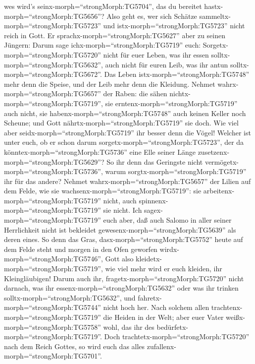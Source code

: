 wes wird's seinx-morph=``strongMorph:TG5704'', das du bereitet
hastx-morph=``strongMorph:TG5656''?  Also geht es, wer sich
Schätze sammeltx-morph=``strongMorph:TG5723'' und
istx-morph=``strongMorph:TG5723'' nicht reich in Gott.  Er
sprachx-morph=``strongMorph:TG5627'' aber zu seinen Jüngern: Darum sage
ichx-morph=``strongMorph:TG5719'' euch:
Sorgetx-morph=``strongMorph:TG5720'' nicht für euer Leben, was ihr essen
solltx-morph=``strongMorph:TG5632'', auch nicht für euren Leib, was ihr
antun solltx-morph=``strongMorph:TG5672''.  Das Leben
istx-morph=``strongMorph:TG5748'' mehr denn die Speise, und der Leib
mehr denn die Kleidung.  Nehmet
wahrx-morph=``strongMorph:TG5657'' der Raben: die sähen
nichtx-morph=``strongMorph:TG5719'', sie
erntenx-morph=``strongMorph:TG5719'' auch nicht, sie
habenx-morph=``strongMorph:TG5748'' auch keinen Keller noch Scheune; und
Gott nährtx-morph=``strongMorph:TG5719'' sie doch. Wie viel aber
seidx-morph=``strongMorph:TG5719'' ihr besser denn die Vögel!
 Welcher ist unter euch, ob er schon darum
sorgetx-morph=``strongMorph:TG5723'', der da
könntex-morph=``strongMorph:TG5736'' eine Elle seiner Länge
zusetzenx-morph=``strongMorph:TG5629''?  So ihr denn das
Geringste nicht vermögetx-morph=``strongMorph:TG5736'', warum
sorgtx-morph=``strongMorph:TG5719'' ihr für das andere? 
Nehmet wahrx-morph=``strongMorph:TG5657'' der Lilien auf dem Felde, wie
sie wachsenx-morph=``strongMorph:TG5719'': sie
arbeitenx-morph=``strongMorph:TG5719'' nicht, auch
spinnenx-morph=``strongMorph:TG5719'' sie nicht. Ich
sagex-morph=``strongMorph:TG5719'' euch aber, daß auch Salomo in aller
seiner Herrlichkeit nicht ist bekleidet
gewesenx-morph=``strongMorph:TG5639'' als deren eines.  So
denn das Gras, dasx-morph=``strongMorph:TG5752'' heute auf dem Felde
steht und morgen in den Ofen geworfen
wirdx-morph=``strongMorph:TG5746'', Gott also
kleidetx-morph=``strongMorph:TG5719'', wie viel mehr wird er euch
kleiden, ihr Kleingläubigen!  Darum auch ihr,
fragetx-morph=``strongMorph:TG5720'' nicht darnach, was ihr
essenx-morph=``strongMorph:TG5632'' oder was ihr trinken
solltx-morph=``strongMorph:TG5632'', und
fahretx-morph=``strongMorph:TG5744'' nicht hoch her.  Nach
solchem allen trachtenx-morph=``strongMorph:TG5719'' die Heiden in der
Welt; aber euer Vater weißx-morph=``strongMorph:TG5758'' wohl, das ihr
des bedürfetx-morph=``strongMorph:TG5719''.  Doch
trachtetx-morph=``strongMorph:TG5720'' nach dem Reich Gottes, so wird
euch das alles zufallenx-morph=``strongMorph:TG5701''. 
